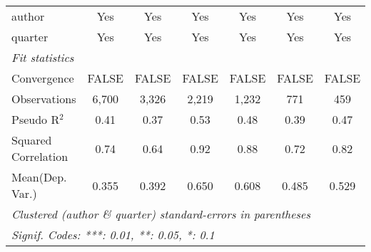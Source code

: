 \begin{tabular}{lcccccc}
   author                                                     & Yes           & Yes           & Yes           & Yes           & Yes           & Yes\\  
   quarter                                                    & Yes           & Yes           & Yes           & Yes           & Yes           & Yes\\  
   \midrule
   \emph{Fit statistics}\\
   Convergence                                                &FALSE          & FALSE         & FALSE         & FALSE         & FALSE         & FALSE\\  
   Observations                                               & 6,700         & 3,326         & 2,219         & 1,232         & 771           & 459\\  
   Pseudo R$^2$                                               & 0.41          & 0.37          & 0.53          & 0.48          & 0.39          & 0.47\\  
   Squared Correlation                                        & 0.74          & 0.64          & 0.92          & 0.88          & 0.72          & 0.82\\  
Mean(Dep. Var.) & 0.355 & 0.392 & 0.650 & 0.608 & 0.485 & 0.529 \\
   \midrule \midrule
   \multicolumn{7}{l}{\emph{Clustered (author \& quarter) standard-errors in parentheses}}\\
   \multicolumn{7}{l}{\emph{Signif. Codes: ***: 0.01, **: 0.05, *: 0.1}}\\
\end{tabular}
\par\endgroup
